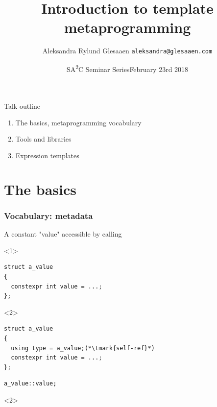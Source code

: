 \documentclass[14pt]{beamer}
\title{Introduction to template metaprogramming}
\author{\texorpdfstring{%
    Aleksandra Rylund Glesaaen\newline%
    \fontsize{12pt}{12pt}\selectfont\texttt{aleksandra@glesaaen.com}%
  }{%
    Aleksandra Rylund Glesaaen}}
\date{\texorpdfstring{%
    SA{\color{SA2COrange}\textsuperscript{2}}C Seminar Series\newline{}February 23rd 2018%
  }{%
    February 23rd 2018}}
\begin{document}
\nocite{*}

\frame{\titlepage}

\begin{frame}{Talk outline}

  \begin{enumerate} \setlength\itemsep{.5em}
    \item The basics, metaprogramming vocabulary
    \item Tools and libraries
    \item Expression templates
  \end{enumerate}
  
\end{frame}

\section{The basics}
\frame{\sectionpage}

\begin{frame}[fragile]
  \frametitle{Vocabulary: metadata}

  A constant "value" accessible by calling 

  \begin{overlayarea}{\textwidth}{4cm}
  \begin{onlyenv}<1>
  \begin{lstlisting}[basicstyle=\codefontsize{12pt}]
struct a_value
{
  constexpr int value = ...;
};
  \end{lstlisting}
  \end{onlyenv}

  \begin{onlyenv}<2>
  \begin{lstlisting}[basicstyle=\codefontsize{12pt}]
struct a_value
{
  using type = a_value;(*\tmark{self-ref}*)
  constexpr int value = ...;
};
  \end{lstlisting}
  \end{onlyenv}

  \begin{lstlisting}[basicstyle=\codefontsize{12pt}]
a_value::value;
  \end{lstlisting}

  \end{overlayarea}

  \begin{onlyenv}<2>
    \nointerlineskip
  \end{onlyenv}

\end{frame}
\end{document}

